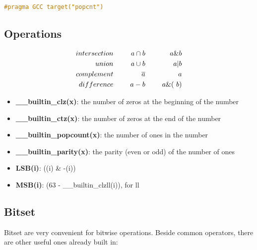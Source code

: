     \begin{lstlisting}[language=c++]
    #pragma GCC target("popcnt")
    \end{lstlisting}

    \subsection{Operations}

    \begin{align*}
        intersection & \hspace{5mm} & a \cap b     & \hspace{5mm} &  a \& b \\
        union        & \hspace{5mm} & a  \cup b    & \hspace{5mm} &  a | b \\
        complement   & \hspace{5mm} & \overline{a} & \hspace{5mm} &  ~a \\
        difference   & \hspace{5mm} & a - b        & \hspace{5mm} &  a \& (~b) \\
    \end{align*}

    \begin{itemize} 
        \item \textbf{\_\_builtin\_clz(x)}: the number of zeros at the beginning of the number
        \item \textbf{\_\_builtin\_ctz(x)}: the number of zeros at the end of the number
        \item \textbf{\_\_builtin\_popcount(x)}: the number of ones in the number
        \item \textbf{\_\_builtin\_parity(x)}: the parity (even or odd) of the number of ones

        \item \textbf{LSB(i)}: ((i) \& -(i))
        \item \textbf{MSB(i)}: (63 - \_\_builtin\_clzll(i)), for ll
    \end{itemize}
    
    \subsection{Bitset}

    Bitset are very convenient for bitwise operations. Beside common operators, there are other useful ones already built in:
    
